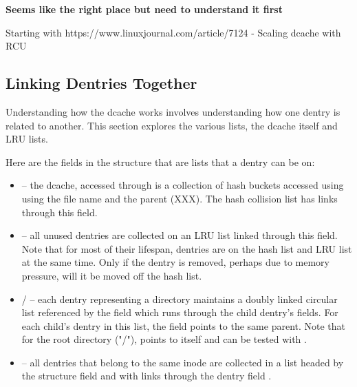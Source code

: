 \textbf{Seems like the right place but need to understand it first}

Starting with https://www.linuxjournal.com/article/7124 - Scaling dcache with RCU


\subsection{Linking Dentries Together}\label{dcache-links}


Understanding how the dcache works involves understanding how one dentry is related to another. This section explores the various lists, the dcache itself and LRU lists. 

Here are the fields in the  structure that are lists that a dentry can be on:

\begin{itemize}
	\item {} -- the dcache, accessed through  is a collection of hash buckets accessed 
		using  using the file name and the parent (XXX). The hash collision list has links through this field.
	\item {} -- all unused dentries are collected on an LRU list linked through this field. Note that for most of their
		lifespan, dentries are on the hash list and LRU list at the same time. Only if the dentry is removed, perhaps due 
		to memory pressure, will it be moved off the hash list.
	\item {} /  -- each dentry representing a directory maintains a doubly linked circular list 
		referenced by the  field which runs through the child dentry's  fields. For each 
		child's dentry in this list, the  field points to the same parent. Note that for the root directory 
		("/"),  points to itself and can be tested with .
	\item {} -- all dentries that belong to the same inode are collected in a list headed by the  structure field 
		 and with links through the dentry field . 
\end{itemize}

